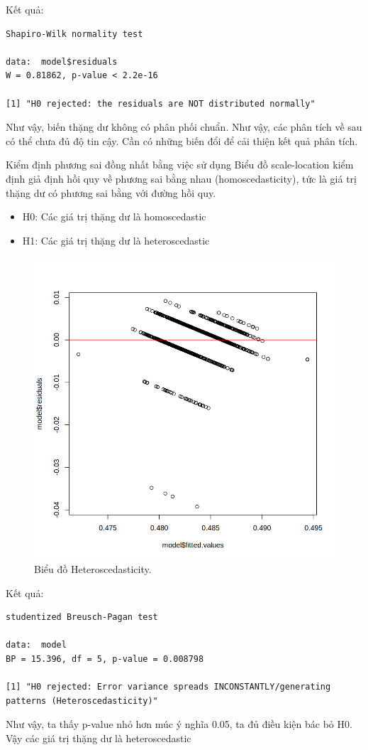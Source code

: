 Kết quả:
\begin{lstlisting}
Shapiro-Wilk normality test

data:  model$residuals
W = 0.81862, p-value < 2.2e-16

[1] "H0 rejected: the residuals are NOT distributed normally"
\end{lstlisting}
Như vậy, biến thặng dư không có phân phối chuẩn. Như vậy, các phân tích về sau có thể chưa đủ độ tin cậy. Cần có những biến đổi để cải thiện kết quả phân tích.

Kiểm định phương sai đồng nhất bằng việc sử dụng Biểu đồ scale-location kiểm định giả định hồi quy về phương sai bằng nhau (homoscedasticity), tức là giá trị thặng dư có phương sai bằng với đường hồi quy.
\begin{itemize}
    \item H0: Các giá trị thặng dư là homoscedastic
    \item H1: Các giá trị thặng dư là heteroscedastic
\end{itemize}
\begin{figure}[H]
    \centering
    \includegraphics[width=0.75\columnwidth]{wine_figures/red_scale_test.png}
    \caption{Biểu đồ Heteroscedasticity.}
    \label{fig:red_scale_test}
\end{figure}
Kết quả:
\begin{lstlisting}
studentized Breusch-Pagan test

data:  model
BP = 15.396, df = 5, p-value = 0.008798

[1] "H0 rejected: Error variance spreads INCONSTANTLY/generating patterns (Heteroscedasticity)"
\end{lstlisting}
Như vậy, ta thấy p-value nhỏ hơn múc ý nghĩa 0.05, ta đủ điều kiện bác bỏ H0. Vậy các giá trị thặng dư là heteroscedastic

